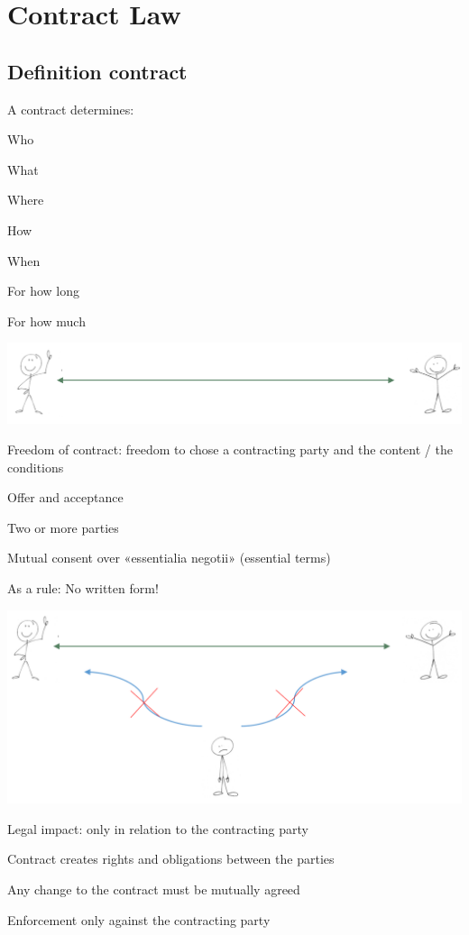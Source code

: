 \section{Contract Law}
\subsection{Definition contract}
A contract determines:
\begin{compactitem}
	\item Who
	\item What
	\item Where
	\item How
	\item When
	\item For how long
	\item For how much
\end{compactitem}
\includegraphics[width=1\linewidth]{images/contract1}
\begin{compactitem}
	\item Freedom of contract: freedom to chose a contracting party and the content / the conditions
	\item Offer and acceptance
	\item Two or more parties
	\item Mutual consent over «essentialia negotii» (essential terms)
	\item As a rule: No written form!
\end{compactitem}
\includegraphics[width=1\linewidth]{images/contract2}
\begin{compactitem}
	\item Legal impact: only in relation to the contracting party
	\item Contract creates rights and obligations between the parties
	\item Any change to the contract must be mutually agreed
	\item Enforcement only against the contracting party
\end{compactitem}

